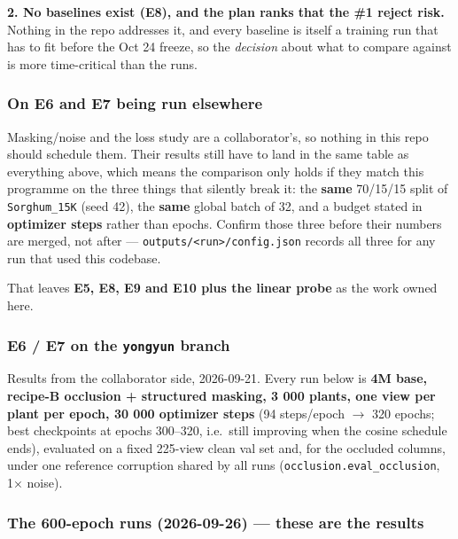 \documentclass[
  10pt,
]{article}
\begin{document}
\textbf{2. No baselines exist (E8), and the plan ranks that the \#1
reject risk.} Nothing in the repo addresses it, and every baseline is
itself a training run that has to fit before the Oct 24 freeze, so the
\emph{decision} about what to compare against is more time-critical than
the runs.

\subsubsection{On E6 and E7 being run
elsewhere}\label{on-e6-and-e7-being-run-elsewhere}

Masking/noise and the loss study are a collaborator's, so nothing in
this repo should schedule them. Their results still have to land in the
same table as everything above, which means the comparison only holds if
they match this programme on the three things that silently break it:
the \textbf{same} 70/15/15 split of \texttt{Sorghum\_15K} (seed 42), the
\textbf{same} global batch of 32, and a budget stated in
\textbf{optimizer steps} rather than epochs. Confirm those three before
their numbers are merged, not after ---
\texttt{outputs/\textless{}run\textgreater{}/config.json} records all
three for any run that used this codebase.

That leaves \textbf{E5, E8, E9 and E10 plus the linear probe} as the
work owned here.

\subsubsection{\texorpdfstring{E6 / E7 on the \texttt{yongyun}
branch}{E6 / E7 on the yongyun branch}}\label{e6-e7-on-the-yongyun-branch}

Results from the collaborator side, 2026-09-21. Every run below is
\textbf{4M base, recipe-B occlusion + structured masking, 3 000 plants,
one view per plant per epoch, 30 000 optimizer steps} (94 steps/epoch
\(\to\) 320 epochs; best checkpoints at epochs 300--320, i.e.~still
improving when the cosine schedule ends), evaluated on a fixed 225-view
clean val set and, for the occluded columns, under one reference
corruption shared by all runs (\texttt{occlusion.eval\_occlusion}, 1×
noise).

\subsubsection{The 600-epoch runs (2026-09-26) --- these are the
results}\label{the-600-epoch-runs-2026-09-26-these-are-the-results}
\end{document}
